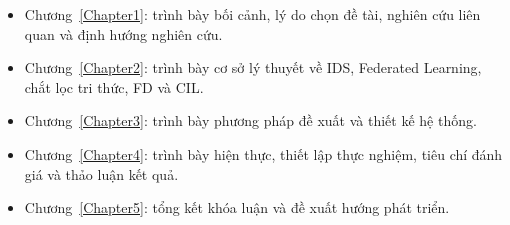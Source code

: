 \begin{itemize}
    \item Chương~\ref{Chapter1}: \textbf{} trình bày bối cảnh, lý do chọn đề tài, nghiên cứu liên quan và định hướng nghiên cứu.
    \item Chương~\ref{Chapter2}: \textbf{} trình bày cơ sở lý thuyết về IDS, Federated Learning, chắt lọc tri thức, FD và CIL.
    \item Chương~\ref{Chapter3}: \textbf{} trình bày phương pháp đề xuất và thiết kế hệ thống.
    \item Chương~\ref{Chapter4}: \textbf{} trình bày hiện thực, thiết lập thực nghiệm, tiêu chí đánh giá và thảo luận kết quả.
    \item Chương~\ref{Chapter5}: \textbf{} tổng kết khóa luận và đề xuất hướng phát triển.
\end{itemize}
